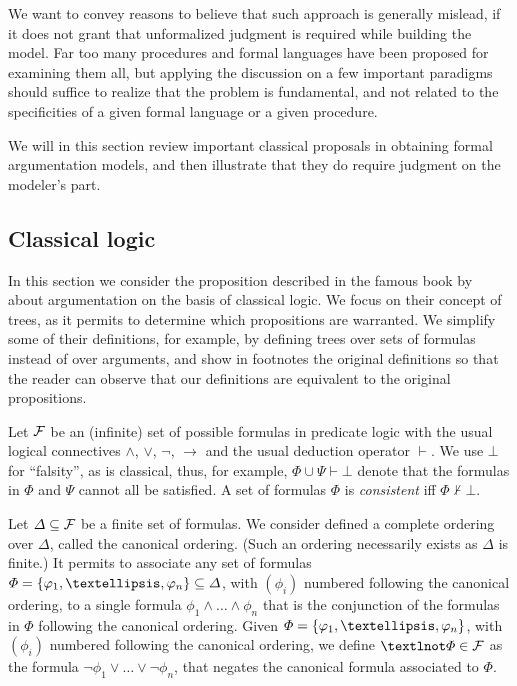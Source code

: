\documentclass[version=3.21, pagesize, twoside=off, bibliography=totoc, DIV=calc, fontsize=12pt, a4paper, french, english]{scrartcl}
\begin{document}
We want to convey reasons to believe that such approach is generally mislead, if it does not grant that unformalized judgment is required while building the model.
Far too many procedures and formal languages have been proposed for examining them all, but applying the discussion on a few important paradigms should suffice to realize that the problem is fundamental, and not related to the specificities of a given formal language or a given procedure.

We will in this section review important classical proposals in obtaining formal argumentation models, and then illustrate that they do require judgment on the modeler’s part.

\subsection{Classical logic}
In this section we consider the proposition described in the famous book by \citet{besnard_elements_2000} about argumentation on the basis of classical logic. We focus on their concept of trees, as it permits to determine which propositions are warranted. We simplify some of their definitions, for example, by defining trees over sets of formulas instead of over arguments, and show in footnotes the original definitions so that the reader can observe that our definitions are equivalent to the original propositions.

Let $\mathcal{F}$ be an (infinite) set of possible formulas in predicate logic with the usual logical connectives $\land$, $\lor$, $¬$, $→$ and the usual deduction operator $⊢$. 
We use $⊥$ for “falsity”, as is classical, thus, for example, $\Phi \cup \Psi ⊢ ⊥$ denote that the formulas in $\Phi$ and $\Psi$ cannot all be satisfied. A set of formulas $\Phi$ is \emph{consistent} iff $\Phi ⊬ ⊥$.

Let $\Delta \subseteq \mathcal{F}$ be a finite set of formulas.
We consider defined a complete ordering over $\Delta$, called the canonical ordering. (Such an ordering necessarily exists as $\Delta$ is finite.) It permits to associate any set of formulas $\Phi = \set{\phi_1, …, \phi_n} \subseteq \Delta$, with $(\phi_i)$ numbered following the canonical ordering, to a single formula $\phi_1 \land … \land \phi_n$ that is the conjunction of the formulas in $\Phi$ following the canonical ordering.
Given $\Phi = \set{\phi_1, …, \phi_n}$, with $(\phi_i)$ numbered following the canonical ordering, we define $¬\Phi \in \allformulas$ as the formula $¬\phi_1 \lor … \lor ¬\phi_n$, that negates the canonical formula associated to $\Phi$.
\end{document}
